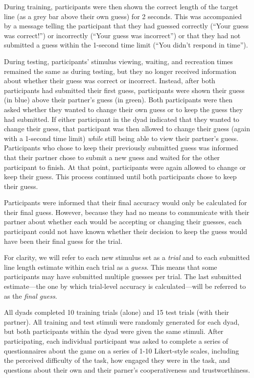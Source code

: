 \documentclass[10pt, letterpaper]{article}
\begin{document}
During training, participants were then shown the correct length of the
target line (as a grey bar above their own guess) for 2 seconds. This
was accompanied by a message telling the participant that they had
guessed correctly (``Your guess was correct!'') or incorrectly (``Your
guess was incorrect'') or that they had not submitted a guess within the
1-second time limit (``You didn't respond in time'').

During testing, participants' stimulus viewing, waiting, and recreation
times remained the same as during testing, but they no longer received
information about whether their guess was correct or incorrect. Instead,
after both participants had submitted their first guess, participants
were shown their guess (in blue) above their partner's guess (in green).
Both participants were then asked whether they wanted to change their
own guess or to keep the guess they had submitted. If either participant
in the dyad indicated that they wanted to change their guess, that
participant was then allowed to change their guess (again with a
1-second time limit) \emph{while} still being able to view their
partner's guess. Participants who chose to keep their previously
submitted guess was informed that their partner chose to submit a new
guess and waited for the other participant to finish. At that point,
participants were again allowed to change or keep their guess. This
process continued until both participants chose to keep their guess.

Participants were informed that their final accuracy would only be
calculated for their final guess. However, because they had no means to
communicate with their partner about whether each would be accepting or
changing their guesses, each participant could not have known whether
their decision to keep the guess would have been their final guess for
the trial.

For clarity, we will refer to each new stimulus set as a \emph{trial}
and to each submitted line length estimate within each trial as a
\emph{guess}. This means that some participants may have submitted
multiple guesses per trial. The last submitted estimate---the one by
which trial-level accuracy is calculated---will be referred to as the
\emph{final guess}.

All dyads completed 10 training trials (alone) and 15 test trials (with
their partner). All training and test stimuli were randomly generated
for each dyad, but both participants within the dyad were given the same
stimuli. After participating, each individual participant was asked to
complete a series of questionnaires about the game on a series of 1-10
Likert-style scales, including the perceived difficulty of the task, how
engaged they were in the task, and questions about their own and their
parner's cooperativeness and trustworthiness.
\end{document}
